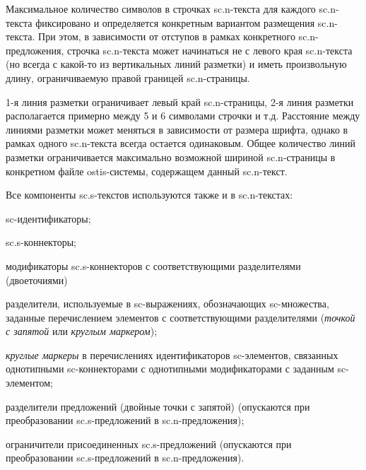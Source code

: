 Максимальное количество символов в строчках sc.n-текста для каждого sc.n-текста фиксировано и определяется конкретным вариантом размещения sc.n-текста. При этом, в зависимости от отступов в рамках конкретного sc.n-предложения, строчка sc.n-текста может начинаться не с левого края sc.n-текста (но всегда с какой-то из вертикальных линий разметки) и иметь произвольную длину, ограничиваемую правой границей sc.n-страницы.


\begin{SCn}
\end{SCn}
1-я линия разметки ограничивает левый край sc.n-страницы, 2-я линия разметки располагается примерно между 5 и 6 символами строчки и т.д. Расстояние между линиями разметки может меняться в зависимости от размера шрифта, однако в рамках одного sc.n-текста всегда остается одинаковым. Общее количество линий разметки ограничивается максимально возможной шириной sc.n-страницы в конкретном файле ostis-системы, содержащем данный sc.n-текст.


\begin{SCn}
\begin{scnhaselementset}
\end{scnhaselementset}
\end{SCn}


Все компоненты sc.s-текстов используются также и в sc.n-текстах:
\begin{textitemize}
	\item sc-идентификаторы;
	\item sc.s-коннекторы;
	\item модификаторы sc.s-коннекторов с соответствующими разделителями (двоеточиями)
	\item разделители, используемые в sc-выражениях, обозначающих sc-множества, заданные перечислением элементов с соответствующими разделителями (\textit{точкой с запятой} или \textit{круглым маркером});
	\item \textit{круглые маркеры} в перечислениях идентификаторов \mbox{sc-элементов}, связанных однотипными sc-коннекторами с однотипными модификаторами с заданным sc-элементом;
	\item разделители предложений (двойные точки с запятой) (опускаются при преобразовании \mbox{sc.s-предложений} в \mbox{sc.n-предложения});
	\item ограничители присоединенных sc.s-предложений (опускаются при преобразовании sc.s-предложений в sc.n-предложения).
\end{textitemize}

